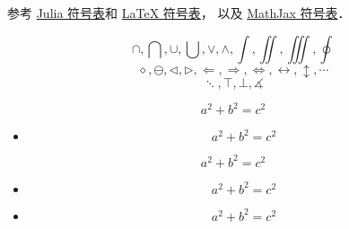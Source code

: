 
参考 \href{https://docs.julialang.org/en/v1/manual/unicode-input/}{Julia 符号表}和 \href{https://oeis.org/wiki/List_of_LaTeX_mathematical_symbols}{LaTeX 符号表}， 以及 \href{http://www.onemathematicalcat.org/MathJaxDocumentation/TeXSyntax.htm#U}{MathJax 符号表}．

\begin{equation}
\cap, \bigcap, \cup, \bigcup, \vee, \wedge, \int, \iint, \iiint, \oint
\end{equation}
\begin{equation}
\diamond, \ominus, \triangleleft, \triangleright, \Longleftarrow, \Longrightarrow, \iff, \leftrightarrow, \updownarrow, \cdots
\end{equation}
\begin{equation}
\ddots, \top, \bot, \measuredangle
\end{equation}

\begin{equation}
a^2 + b^2 = c^2
\end{equation}
\begin{itemize}
\item \begin{equation}
a^2 + b^2 = c^2
\end{equation}
\end{itemize}

\begin{example}{}
\begin{equation}
a^2 + b^2 = c^2
\end{equation}
\begin{itemize}
\item \begin{equation}
a^2 + b^2 = c^2
\end{equation}
\item \begin{equation}
a^2 + b^2 = c^2
\end{equation}
\end{itemize}

\end{example}

\begin{exercise}{}

\end{exercise}

\begin{definition}{}

\end{definition}

\begin{theorem}{}

\end{theorem}

\begin{corollary}{}

\end{corollary}

